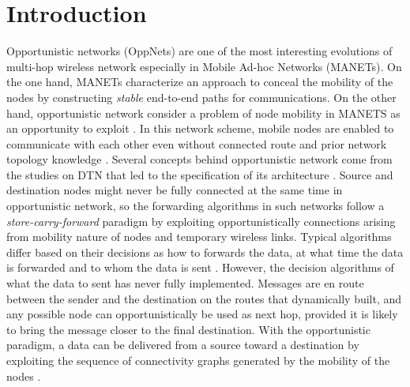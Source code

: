 \chapter{Introduction}
\label{intro}

Opportunistic networks (OppNets) are one of the most interesting evolutions of multi-hop wireless network especially in Mobile Ad-hoc Networks (MANETs).
On the one hand, MANETs characterize an approach to conceal the mobility of the nodes by constructing \emph{stable} end-to-end paths for communications. 
On the other hand, opportunistic network consider a problem of node mobility in MANETS as an opportunity to exploit \cite{Conti2014}.
In this network scheme, mobile nodes are enabled to communicate with each other even without connected route and prior network topology knowledge \cite{Pelusi2006}.
Several concepts behind opportunistic network come from the studies on DTN that led to the specification of its architecture \cite{Conan2008,Yu2012,Rongxing2010,Schurgot2012}. 
Source and destination nodes might never be fully connected at the same time in opportunistic network, so the forwarding algorithms in such networks follow a \emph{store-carry-forward} paradigm \cite{Yamamura2011,Jie2007,Jie2007a} by exploiting opportunistically connections arising from mobility nature of nodes and temporary wireless links. 
Typical algorithms differ based on their decisions as how to forwards the data, at what time the data is forwarded and to whom the data is sent \cite{Joe2010}. 
However, the decision algorithms of what the data to sent has never fully implemented. 
Messages are en route between the sender and the destination on the routes that dynamically built, and any possible node can opportunistically be used as next hop, provided it is likely to bring the message closer to the final destination.
With the opportunistic paradigm, a data can be delivered from a source toward a destination by exploiting the sequence of connectivity graphs generated by the mobility of the nodes \cite{Acer20111,Ferretti2013}.

